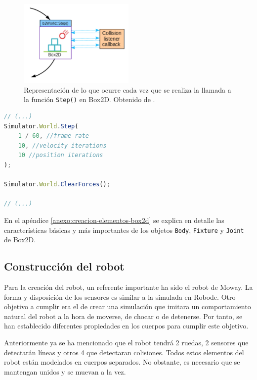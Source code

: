 \begin{figure}[!ht]
	\begin{centering}
		\includegraphics[width=0.5\textwidth]{images/step-box2d.png}
			\caption{Representación de lo que ocurre cada vez que se realiza la llamada a la función \texttt{Step()} en Box2D. Obtenido de \cite{box2d}.}
				\label{fig:step-box2d}
	\end{centering}
\end{figure}

\begin{lstlisting}[language={Javascript},label={code:world-step}, caption={Actualización del mundo en \texttt{Box2D}.}]
// (...)
Simulator.World.Step(
	1 / 60, //frame-rate
	10, //velocity iterations
	10 //position iterations
);

Simulator.World.ClearForces();

// (...)
\end{lstlisting}

En el apéndice \ref{anexo:creacion-elementos-box2d} se explica en detalle las características básicas y más importantes de los objetos \texttt{Body}, \texttt{Fixture} y \texttt{Joint} de Box2D.


\subsection{Construcción del robot}
\label{sec:contruccion-robot}

Para la creación del robot, un referente importante ha sido el robot de Moway. La forma y disposición de los sensores es similar a la simulada en Robode. Otro objetivo a cumplir era el de crear una simulación que imitara un comportamiento natural del robot a la hora de moverse, de chocar o de detenerse. Por tanto, se han establecido diferentes propiedades en los cuerpos para cumplir este objetivo.

Anteriormente ya se ha mencionado que el robot tendrá 2 ruedas, 2 sensores que detectarán líneas y otros 4 que detectaran colisiones. Todos estos elementos del robot están modelados en cuerpos separados. No obstante, es necesario que se mantengan unidos y se muevan a la vez.

